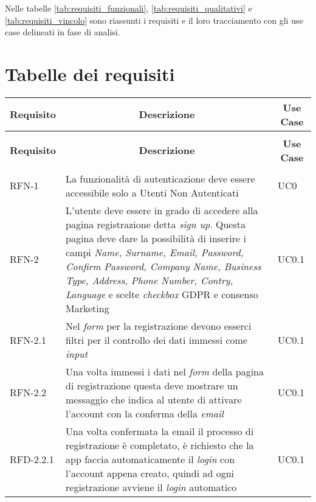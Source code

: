 Nelle tabelle \ref{tab:requisiti_funzionali}, \ref{tab:requisiti_qualitativi} e \ref{tab:requisiti_vincolo} sono riassunti i requisiti e il loro tracciamento con gli use case delineati in fase di analisi.

\section{Tabelle dei requisiti}


\begin{center}
    \begin{longtable}{|p{2.25cm}|p{7.75cm}|p{2.25cm}|}
    \hline
    \multicolumn{1}{|c|}{\textbf{Requisito}} & \multicolumn{1}{c|}{\textbf{Descrizione}} & \multicolumn{1}{c|}{\textbf{Use Case}}\\
    \hline 
    \endfirsthead
    \rowcolor{white}
    \multicolumn{3}{c}{{\bfseries \tablename\ \thetable{} -- Continuo della tabella}}\\
    \hline
    \multicolumn{1}{|c|}{\textbf{Requisito}} & \multicolumn{1}{c|}{\textbf{Descrizione}} & \multicolumn{1}{c|}{\textbf{Use Case}}\\
    \hline 
    \endhead
    \hline
    \rowcolor{white}
    \multicolumn{3}{|r|}{{Continua nella prossima pagina...}}\\
    \hline
    \endfoot
    \endlastfoot
    RFN-1 & La funzionalità di autenticazione deve essere accessibile solo a Utenti Non Autenticati & UC0 \\
    \hline
    RFN-2 & L'utente deve essere in grado di accedere alla pagina registrazione detta \textit{sign up}. Questa pagina deve dare la possibilità di inserire i campi \textit{Name, Surname, Email, Password, Confirm Password, Company Name, Business Type, Address, Phone Number, Contry, Language} e scelte \textit{checkbox} GDPR e consenso Marketing & UC0.1 \\
    \hline
    RFN-2.1 & Nel \textit{form} per la registrazione devono esserci filtri per il controllo dei dati immessi come \textit{input} & UC0.1 \\
    \hline
    RFN-2.2 & Una volta immessi i dati nel \textit{form} della pagina di registrazione questa deve mostrare un messaggio che indica al utente di attivare l'account con la conferma della \textit{email} & UC0.1 \\
    \hline
    RFD-2.2.1 & Una volta confermata la email il processo di registrazione è completato, è richiesto che la app faccia automaticamente il \textit{login} con l'account appena creato, quindi ad ogni registrazione avviene il \textit{login} automatico & UC0.1 \\

\end{longtable}
\end{center}
